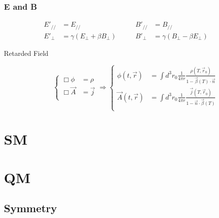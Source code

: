 \subsubsection{E and B}
\begin{equation}
    \label{eqn:em::sr:::E&B}
    \begin{aligned}
	E'_{//} &= E_{//}   \qquad&   B'_{//} &= B_{//}	\\
	E'_{\perp} &= \gamma (E_{\perp} + \beta B_{\perp})   \qquad& B'_{\perp} &= \gamma(B_{\perp} - \beta E_{\perp})
    \end{aligned}
\end{equation}
\begin{description}
    \item [Retarded Field]
	\begin{equation}
	    \label{eqn:em::retardedField}
	    \left\{
	    \begin{aligned}
		\Box\phi &= \rho	\\
		\Box \vec{A} &= \vec{j}	\\
	    \end{aligned}
            \right.
	    \Rightarrow
	    \left\{
	    \begin{aligned}
		\phi(t,\vec{r}) &= \int d^3r_0 \frac{1}{4\pi r}\frac{\rho(T,\vec{r}_0)}{1-\vec{\beta}(T)\cdot\vec{n}}   \\
		\vec{A}(t,\vec{r})  &= \int d^3r_0 \frac{1}{4\pi r}\frac{\vec{j}(T,\vec{r}_0)}{1-\vec{n}\cdot\vec{\beta}(T)}   \\ 
	    \end{aligned}
            \right.
	\end{equation}
\end{description}

\section{SM}

\section{QM}

\subsection{Symmetry}

